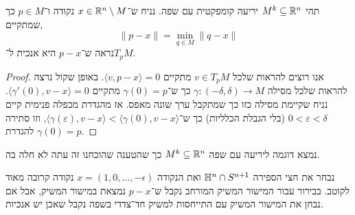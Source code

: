 \question[4]
\subquestion{}
תהי $M^k \subseteq \mathbb{R}^n$ יריעה קומפקטית עם שפה.
נניח ש־$x \in \mathbb{R}^n \setminus M$ נקודה ו־$p \in M$ כך שמתקיים,
\[
	\lVert p - x \rVert
	= \min_{q \in M} \lVert q - x \rVert
\]
נראה ש־$p - x$ היא אנכית ל־$T_p M$.
\begin{proof}
	אנו רוצים להראות שלכל $v \in T_p M$ מתקיים $\langle v, p - x \rangle = 0$.
	באופן שקול נרצה להראות שלכל מסילה $\gamma : (-\delta, \delta) \to M$ כך ש־$\gamma(0) = p$ מתקיים $\langle \gamma'(0), v - x \rangle = 0$.
	נניח שקיימת מסילה כזו כך שמתקבל ערך שונה מאפס.
	אז מהגדרת מכפלה פנימית קיים $0 < \varepsilon < \delta$ (בלי הגבלת הכלליות) כך ש־$\langle \gamma(\varepsilon), v - x \rangle < \langle \gamma(0), v - x \rangle$, וזו סתירה להגדרת $\gamma(0) = p$.
\end{proof}

\subquestion{}
נמצא דוגמה ליריעה עם שפה $M^k \subseteq \mathbb{R}^n$ כך שהטענה שהוכחנו זה עתה לא חלה בה.
\begin{solution}
	נבחר את חצי הספירה $\mathbb{H}^n \cap S^{n + 1}$ ואת הנקודה $x = (1, 0, \ldots, -\epsilon)$ נקודה קרובה מאוד לקוטב.
	בבירור עבור המישור המשיק המורחב נקבל ש־$p - x$ נמצאת במישור המשיק, אבל אם נבחן את המישור המשיק עם התייחסות למשיק חד־צדדי בשפה נקבל שאכן יש אנכיות.
\end{solution}

\subquestion{}



